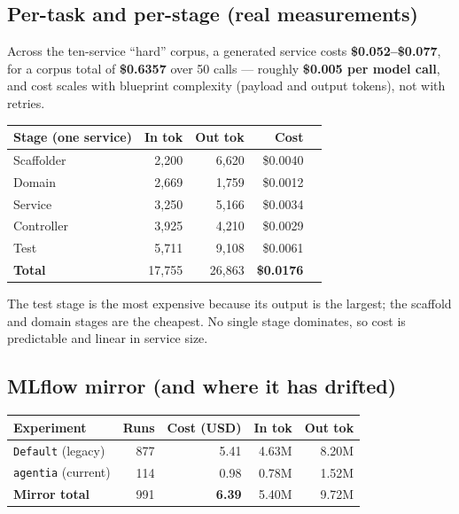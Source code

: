 \documentclass[11pt,a4paper]{article}
\begin{document}
\subsection{Per-task and per-stage (real measurements)}

Across the ten-service ``hard'' corpus, a generated service costs \textbf{\$0.052--\$0.077},
for a corpus total of \textbf{\$0.6357} over 50 calls --- roughly \textbf{\$0.005 per
model call}, and cost scales with blueprint complexity (payload and output tokens),
not with retries.

\begin{center}
\begin{tabular}{@{}lrrrr@{}}
\toprule
\textbf{Stage (one service)} & \textbf{In tok} & \textbf{Out tok} & \textbf{Cost} \\
\midrule
Scaffolder & 2{,}200 & 6{,}620 & \$0.0040 \\
Domain & 2{,}669 & 1{,}759 & \$0.0012 \\
Service & 3{,}250 & 5{,}166 & \$0.0034 \\
Controller & 3{,}925 & 4{,}210 & \$0.0029 \\
Test & 5{,}711 & 9{,}108 & \$0.0061 \\
\midrule
\textbf{Total} & 17{,}755 & 26{,}863 & \textbf{\$0.0176} \\
\bottomrule
\end{tabular}
\end{center}

The test stage is the most expensive because its output is the largest; the scaffold
and domain stages are the cheapest. No single stage dominates, so cost is predictable
and linear in service size.

\subsection{MLflow mirror (and where it has drifted)}

\begin{center}
\begin{tabular}{@{}lrrrr@{}}
\toprule
\textbf{Experiment} & \textbf{Runs} & \textbf{Cost (USD)} & \textbf{In tok} & \textbf{Out tok} \\
\midrule
\texttt{Default} (legacy) & 877 & 5.41 & 4.63M & 8.20M \\
\texttt{agentia} (current) & 114 & 0.98 & 0.78M & 1.52M \\
\midrule
\textbf{Mirror total} & 991 & \textbf{6.39} & 5.40M & 9.72M \\
\bottomrule
\end{tabular}
\end{center}
\end{document}
